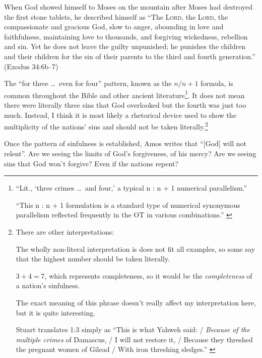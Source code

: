 When God showed himself to Moses on the mountain after Moses had destroyed the
first stone tablets, he described himself as \enquote{The \textsc{Lord}, the
\textsc{Lord}, the compassionate and gracious God, slow to anger, abounding in
love and faithfulness, maintaining love to thousands, and forgiving wickedness,
rebellion and sin. Yet he does not leave the guilty unpunished; he punishes the
children and their children for the sin of their parents to the third and fourth
generation.} (Exodus 34:6b--7)

The \enquote{for three \dots\ even for four} pattern, known as the $n / n + 1$
formula, is common throughout the Bible and other ancient
literature\autocite[See][70]{smith:2017}\footnote{%
\enquote{Lit., \enquote{three crimes \dots\ and four,} a typical n : n + 1
numerical parallelism.}
\autocite[306]{stuart:1988}

\enquote{This n : n + 1 formulation is a standard type of numerical
synonymous parallelism reflected frequently in the OT in various
combinations.}
\autocite[310]{stuart:1988}
}. It does not mean there were literally three sins that God overlooked but the
fourth was just too much. Instead, I think it is most likely a rhetorical device
used to show the multiplicity of the nations' sins and should not be taken
literally.\footnote{%
There are other interpretations:
\begin{inparaenum}[(1)]
    \item The wholly non-literal interpretation is does not fit all
    examples, so some say that the highest number should be taken
    literally.
    \item $3+4=7$, which represents completeness, so it would be the
    \textit{completeness} of a nation's sinfulness.
\end{inparaenum}
\autocite[See][70]{smith:2017}
The exact meaning of this phrase doesn't really affect my interpretation
here, but it is quite interesting.

Stuart translates 1:3 simply as \enquote{This is what Yahweh said: /
\textit{Because of the multiple crimes} of Damascus, / I will not restore
it, / Because they threshed the pregnant women of Gilead / With iron
threshing sledges.}
\autocite[303-304]{stuart:1988}
}

Once the pattern of sinfulness is established, Amos writes that \enquote{[God]
will not relent}. Are we seeing the limits of God's forgiveness, of his mercy?
Are we seeing sins that God won't forgive? Even if the nations repent?

